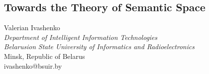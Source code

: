 \setlength{\parskip}{6pt}
\begin{center}
\chapter{ \leftskip=40mm { \huge\textbf{Towards the Theory of Semantic Space}}}
\vspace{0.3in}
    \newline
    
\large
 Valerian Ivashenko\\
  \textit{Department of Intelligent Information Technologies}\\
   \textit{Belarusion State University of Informatics and Radioelectronics
}\\
 Minsk, Republic of Belarus\\
    ivashenko@bsuir.by
\end{center}
\vspace{0.3in}
